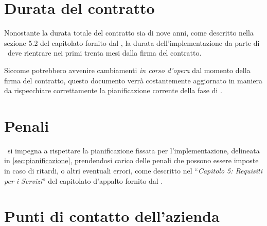 %	
%	
	
	
\section{Durata del contratto}
	
	Nonostante la durata totale del contratto sia di nove anni, come descritto nella sezione 5.2 del capitolato fornito dal \proponente, la durata dell'implementazione da parte di \azienda~deve rientrare nei primi trenta mesi dalla firma del contratto.
	
	Siccome potrebbero avvenire cambiamenti \textit{in corso d'opera} dal momento della firma del contratto, questo documento verrà costantemente aggiornato in maniera da rispecchiare correttamente la pianificazione corrente della fase di \rollout.

	
\section{Penali}

	\azienda~si impegna a rispettare la pianificazione fissata per l'implementazione, delineata in \ref{sec:pianificazione}, prendendosi carico delle penali che possono essere imposte in caso di ritardi, o altri eventuali errori, come descritto nel ``\textit{Capitolo 5: Requisiti per i Servizi}'' del capitolato d'appalto fornito dal \proponente.
	
\section{Punti di contatto dell'azienda}

